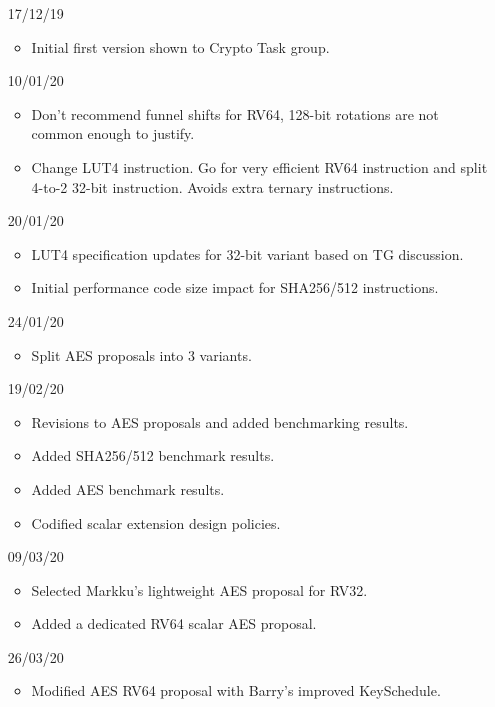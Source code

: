 
\begin{itemize}
\item[17/12/19] \begin{itemize}
    \item Initial first version shown to Crypto Task group.
\end{itemize}
\item[10/01/20] \begin{itemize}
    \item Don't recommend funnel shifts for RV64, 128-bit rotations
          are not common enough to justify.
    \item Change LUT4 instruction. Go for very efficient RV64 instruction
          and split 4-to-2 32-bit instruction.
          Avoids extra ternary instructions.
\end{itemize}
\item[20/01/20] \begin{itemize}
    \item LUT4 specification updates for 32-bit variant based on TG discussion.
    \item Initial performance code size impact for SHA256/512 instructions.
\end{itemize}
\item[24/01/20] \begin{itemize}
    \item Split AES proposals into 3 variants.
\end{itemize}
\item[19/02/20] \begin{itemize}
    \item Revisions to AES proposals and added benchmarking results.
    \item Added SHA256/512 benchmark results.
    \item Added AES        benchmark results.
    \item Codified scalar extension design policies.
\end{itemize}
\item[09/03/20] \begin{itemize}
    \item Selected Markku's lightweight AES proposal for RV32.
    \item Added a dedicated RV64 scalar AES proposal.
\end{itemize}
\item[26/03/20] \begin{itemize}
    \item Modified AES RV64 proposal with Barry's improved KeySchedule.

\end{itemize}
\end{itemize}
